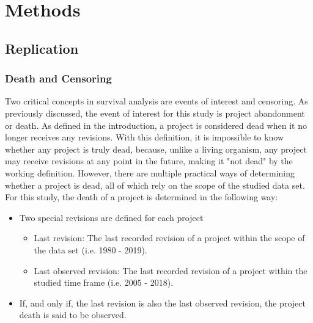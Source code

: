 \documentclass[acmconf]{acmart}
\begin{document}

\section{Methods} \label{methods}

\subsection{Replication} \label{replmethods}
\subsubsection{Death and Censoring} \label{death_censoring}

Two critical concepts in survival analysis are events of interest and censoring.
As previously discussed, the event of interest for this study is project abandonment or death.
As defined in the introduction, a project is considered dead when it no longer receives any revisions.
With this definition, it is impossible to know whether any project is truly dead, because, unlike a living organism, any project may receive revisions at any point in the future, making it "not dead" by the working definition.
However, there are multiple practical ways of determining whether a project is dead, all of which rely on the scope of the studied data set.
For this study, the death of a project is determined in the following way:
\begin{itemize}
    \item Two special revisions are defined for each project
    \begin{itemize}
        \item Last revision: The last recorded revision of a project within the scope of the data set (i.e. 1980 - 2019).
        \item Last observed revision: The last recorded revision of a project within the studied time frame (i.e. 2005 - 2018).
    \end{itemize}
    \item If, and only if, the last revision is also the last observed revision, the project death is said to be observed.
\end{itemize}
\end{document}
